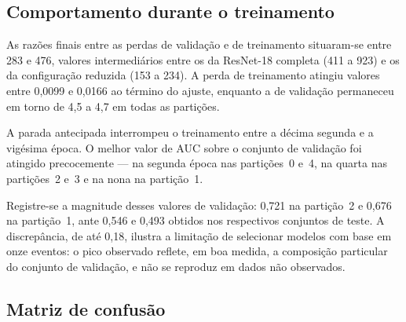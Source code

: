 \subsection{Comportamento durante o treinamento}
\label{subsec:treinamento-resnet34}

As razões finais entre as perdas de validação e de treinamento situaram-se
entre 283 e 476, valores intermediários entre os da ResNet-18 completa (411
a 923) e os da configuração reduzida (153 a 234). A perda de treinamento
atingiu valores entre 0,0099 e 0,0166 ao término do ajuste, enquanto a de
validação permaneceu em torno de 4,5 a 4,7 em todas as partições.

A parada antecipada interrompeu o treinamento entre a décima segunda e a
vigésima época. O melhor valor de \gls{AUC} sobre o conjunto de validação
foi atingido precocemente --- na segunda época nas partições~0 e~4, na
quarta nas partições~2 e~3 e na nona na partição~1.

Registre-se a magnitude desses valores de validação: 0,721 na partição~2 e
0,676 na partição~1, ante 0,546 e 0,493 obtidos nos respectivos conjuntos de
teste. A discrepância, de até 0,18, ilustra a limitação de selecionar modelos
com base em onze eventos: o pico observado reflete, em boa medida, a
composição particular do conjunto de validação, e não se reproduz em dados
não observados.

\subsection{Matriz de confusão}
\label{subsec:confusao-resnet34}

\begin{table}[h!]
	\captionsetup{width=11cm}
\end{table}


